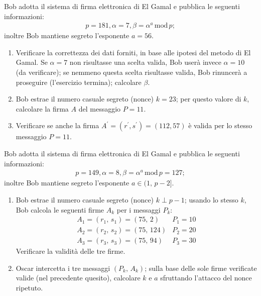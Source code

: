         Bob adotta il sistema di firma elettronica di El Gamal e pubblica le seguenti informazioni:
        \begin{gather*}
            p=181, \alpha = 7, \beta = \alpha^a\,\mathrm{mod}\,p
        ;\end{gather*}
        inoltre Bob mantiene segreto l'esponente $a=56$.
        \begin{enumerate}
            \item Verificare la correttezza dei dati forniti, in base alle ipotesi del metodo di El Gamal. 
                Se $\alpha=7$ non risultasse una scelta valida, Bob userà invece $\alpha=10$ (da verificare); 
                se nemmeno questa scelta risultasse valida, Bob rinuncerà a proseguire (l'esercizio termina); 
                calcolare $\beta$.
            \item Bob estrae il numero casuale segreto (nonce) $k=23$; per questo valore di $k$, calcolare 
                la firma $A$ del messaggio $P=11$.
            \item Verificare se anche la firma $A^{\prime}=(r^{\prime}, s^{\prime})=(112,57)$ è valida per 
                lo stesso messaggio $P=11$.
        \end{enumerate}

        Bob adotta il sistema di firma elettronica di El Gamal e pubblica le seguenti informazioni:
        \begin{gather*}
            p=149, \alpha = 8, \beta = \alpha^a\,\mathrm{mod}\,p=127
        ;\end{gather*}
        inoltre Bob mantiene segreto l'esponente $a\in (1,\,p-2]$.
        \begin{enumerate}
            \item Bob estrae il numero casuale segreto (nonce) $k\perp p-1$; usando lo stesso $k$, 
                Bob calcola le seguenti firme $A_k$ per i messaggi $P_k$:
                \[\begin{array}{ll}
                    A_1=(r_1,\,s_1)=(75,\,2) & P_1=10\\
                    A_2=(r_2,\,s_2)=(75,\,124) & P_2=20\\
                    A_3=(r_3,\,s_3)=(75,\,94) & P_3=30
                \end{array}\]
                Verificare la validità delle tre firme.
            \item Oscar intercetta i tre messaggi $(P_k,\,A_k)$; sulla base delle sole firme verificate valide 
                (nel precedente quesito), calcolare $k$ e $a$ sfruttando l'attacco del nonce ripetuto.
        \end{enumerate}

